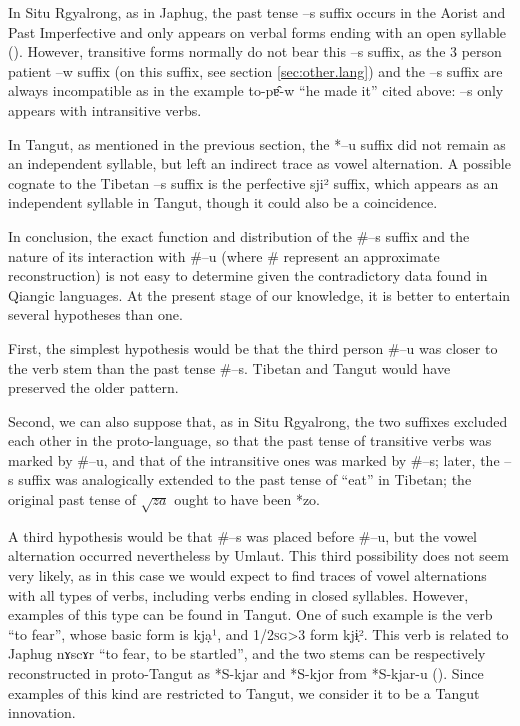 \documentclass[oldfontcommands,twoside,a4paper,12pt]{memoir}
\newcommand{\ipa}[1]{{\phon #1}}
\newcommand{\sg}{\textsc{sg}}
\newcommand{\racine}[1]{\begin{math}\sqrt{#1}\end{math}}
\begin{document}
In Situ Rgyalrong, as in Japhug, the past tense --s suffix occurs in the Aorist and Past Imperfective and only appears on verbal forms ending with an open syllable (\citealt[p. 262]{youjing03zhuokeji}). However, transitive forms normally do not bear this --s suffix, as the 3 person patient --w suffix (on this suffix, see section \ref{sec:other.lang}) and the --s suffix are always incompatible as in the example \ipa{to-pɐ̂-w} ``he made it'' cited above: --s only appears with intransitive verbs.

In Tangut, as mentioned in the previous section, the *--u suffix did not remain as an independent syllable, but left an indirect trace as vowel alternation. A possible cognate to the Tibetan --s suffix is the perfective  \ipa{sji²} suffix, which appears as an independent syllable in Tangut, though it could also be a coincidence.

In conclusion, the exact function and distribution of the \#{}--s suffix  and the nature of its interaction with \#{}--u (where \#{} represent an approximate reconstruction) is not easy to determine given the contradictory data found in Qiangic languages.  At the present stage of our knowledge, it is better to entertain several hypotheses than one.

First, the simplest hypothesis would be that the third person \#{}--u was closer to the verb stem than the past tense \#{}--s. Tibetan and Tangut would have preserved the older pattern.

Second, we can also suppose that, as in Situ Rgyalrong, the two suffixes excluded each other in the proto-language, so that the past tense of transitive verbs was marked by \#{}--u, and that of the intransitive ones was marked by \#{}--s; later, the --s suffix was analogically extended to the past tense of ``eat'' in Tibetan; the original past tense of \racine{za} ought to have been *zo.

A third hypothesis would be that \#{}--s was placed before \#{}--u, but the vowel alternation occurred nevertheless by Umlaut. This third possibility does not seem very likely, as in this case we would expect to find traces of vowel alternations with all types of verbs, including verbs ending in closed syllables. However, examples of this type can be found in Tangut. One of such example is the verb ``to fear'', whose basic form is  \ipa{kjạ¹}, and 1/2\sg{}>3 form	 \ipa{kjɨ̣²}. This verb is related to Japhug \ipa{nɤscɤr} ``to fear, to be startled'', and the two stems can be respectively reconstructed in proto-Tangut as *S-kjar and *S-kjor from *S-kjar-u (\citealt{jacques10esquisse}). Since examples of this kind are restricted to Tangut, we consider it to be a Tangut innovation.
\end{document}

